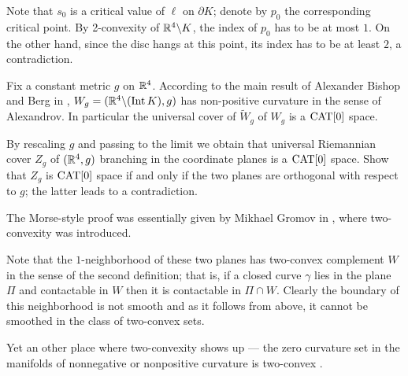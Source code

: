 Note that $s_0$ is a critical value of $\ell$ on $\partial K$;
denote by $p_0$ the corresponding critical point.
By 2-convexity of $\mathbb{R}^4\backslash K$,
the index of $p_0$ has to be at most $1$.
On the other hand, since the disc hangs at this point,
its index has to be at least $2$,
 a contradiction.\qeds

Fix a constant metric $g$ on $\mathbb{R}^4$.
According to the main result of Alexander Bishop and Berg in \cite{ABB}, $W_g\z=(\RR^4\backslash (\Int K),g)$ has non-positive curvature in the sense of Alexandrov.
In particular the universal cover of $\tilde W_g$ of $W_g$ is a $\operatorname{\rm CAT}\nolimits[0]$ space.

By rescaling $g$ and passing to the limit we obtain that universal Riemannian cover $Z_g$ of $(\mathbb{R}^4,g)$ branching in the coordinate planes is a $\operatorname{\rm CAT}\nolimits[0]$ space.
Show that $Z_g$ is $\operatorname{\rm CAT}\nolimits[0]$ space if and only if the two planes are orthogonal with respect to $g$;
the latter leads to a contradiction.\qeds

The Morse-style proof was essentially given  by Mikhael Gromov in \cite[][\S\textonehalf]{gromov-SGMC}, where two-convexity was introduced.

Note that the $1$-neighborhood of these two planes has two-convex complement $W$ in the sense of the second definition;
that is, if a closed curve $\gamma$ lies in the plane $\Pi$
and contactable in $W$ then it is contactable in $\Pi\cap W$.
Clearly the boundary of this neighborhood is not smooth
and as it follows from above, it cannot be smoothed in the class of two-convex sets. 

Yet an other place where two-convexity shows up --- the zero curvature set in the manifolds of nonnegative or nonpositive curvature is two-convex \cite[see][]{panov-petrunin}.